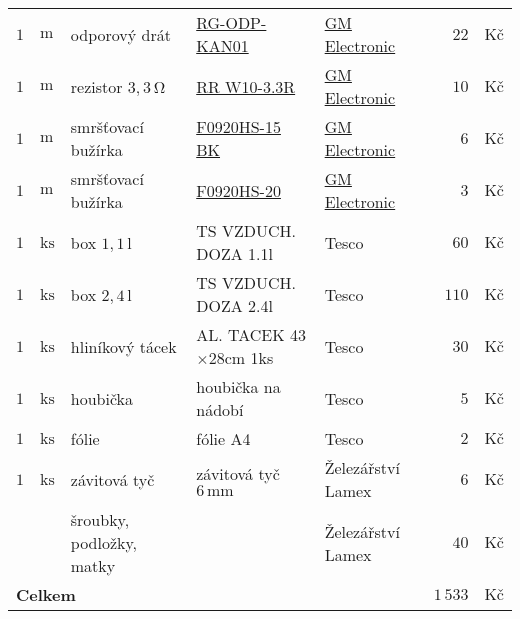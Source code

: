 \begin{table}[h]
\begin{tabular}[t]{|r@{$\,$}l|p{4.6cm}|p{4.2cm}|p{3.1cm}|r@{$\,$}l|}
		$ 1 $ & $\mathrm{m} $ & odporový drát											&	\href{http://www.gme.cz/cz/rg-odp-kan01-p653-005.html}{RG-ODP-KAN01}														&	\href{http://www.gme.cz}{GM Electronic}									&	$ 22 $ & $\textrm{Kč} $	\\	
		$ 1 $ & $\mathrm{m} $ & rezistor $ 3,3 \, \mathrm{\Omega} $		&	\href{http://www.gme.cz/cz/rr-w10-3-3r-p114-186.html}{RR W10-3.3R}																	&	\href{http://www.gme.cz}{GM Electronic}									&	$ 10 $ & $\textrm{Kč} $	\\	
		$ 1 $ & $\mathrm{m} $ &smršťovací bužírka									&	\href{http://www.gme.cz/cz/f0920hs-15-bk-p656-467.html}{F0920HS-15 BK}															&	\href{http://www.gme.cz}{GM Electronic}								&	$ 6 $ & $\textrm{Kč} $	\\	
		$ 1 $ & $\mathrm{m} $ &smršťovací bužírka									&	\href{http://www.gme.cz/cz/f0920hs-20-p656-073.html}{F0920HS-20}																	&	\href{http://www.gme.cz}{GM Electronic}								&	$ 3 $ & $\textrm{Kč} $	\\	
		$ 1 $ & $\mathrm{ks} $ & box $ 1,1 \, \mathrm{l} $							&	TS VZDUCH. DOZA 1.1l																																					&	Tesco																							&	$ 60 $ & $\textrm{Kč} $	\\	
		$ 1 $ & $\mathrm{ks} $ & box $ 2,4 \, \mathrm{l} $							&	TS VZDUCH. DOZA 2.4l																																					&	Tesco																							&	$ 110 $ & $\textrm{Kč} $	\\	
		$ 1 $ & $\mathrm{ks} $ & hliníkový tácek											&	AL. TACEK 43$\times$28cm 1ks																																	&	Tesco																							&	$ 30 $ & $\textrm{Kč} $	\\	
		$ 1 $ & $\mathrm{ks} $ &houbička													&	houbička na nádobí																																								&	Tesco																							&	$ 5 $ & $\textrm{Kč} $	\\	
		$ 1 $ & $\mathrm{ks} $ & fólie																&	fólie A4																																													&	Tesco																							&	$ 2 $ & $\textrm{Kč} $	\\	
		$ 1 $ & $\mathrm{ks} $ & závitová tyč	 											&	závitová tyč $ 6 \, \mathrm{mm} $																																		&	 Železářství Lamex																	&	$ 6 $ & $\textrm{Kč} $	\\	
					&					 & šroubky, podložky, matky 							&																																																		& Železářství Lamex																		&	$ 40 $ & $\textrm{Kč} $	\\	
		\hline\hline
		\multicolumn{5}{|l|}{\textbf{Celkem}} & $ 1\,533 $ & $ \textrm{Kč} $ \\
		\hline
	\end{tabular}
\end{table}

